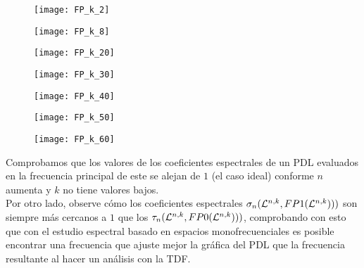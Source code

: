 \begin{figure}[H]
	\centering
	\texttt{[image: FP\_k\_2]} 
\end{figure}	
\begin{figure}[H]
	\centering
	\texttt{[image: FP\_k\_8]} 
\end{figure}	

\begin{figure}[H]
	\centering
	\texttt{[image: FP\_k\_20]} 
\end{figure}	

\begin{figure}[H]
	\centering
	\texttt{[image: FP\_k\_30]} 
\end{figure}	

\begin{figure}[H]
	\centering
	\texttt{[image: FP\_k\_40]} 
\end{figure}	

\begin{figure}[H]
	\centering
	\texttt{[image: FP\_k\_50]} 
\end{figure}	

\begin{figure}[H]
	\centering
	\texttt{[image: FP\_k\_60]} 
\end{figure}	


Comprobamos que los valores de los
coeficientes espectrales de un PDL
evaluados en la frecuencia principal de este 
se alejan de $1$ (el caso ideal)
conforme $n$ aumenta y $k$ no tiene valores bajos. \\

Por otro lado, 
observe cómo los coeficientes espectrales 
$\sigma_{n}(\mathcal{L}^{n,k}, FP1(\mathcal{L}^{n,k})))$ son 
siempre más cercanos a $1$
que los 
$\tau_{n}(\mathcal{L}^{n,k}, FP0(\mathcal{L}^{n,k})))$, 
comprobando con esto que con el estudio
espectral basado en espacios monofrecuenciales
es posible encontrar una frecuencia que ajuste mejor la
gráfica del PDL que la frecuencia resultante
al hacer un análisis con la TDF.

